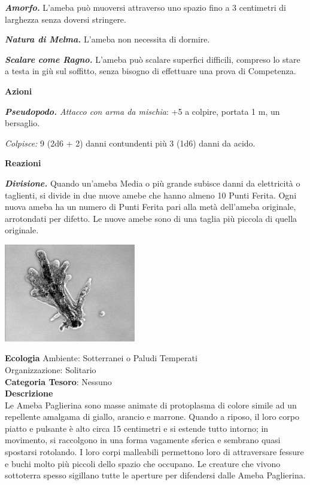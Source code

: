 \begin{multicols}{2}
{\emph{\textbf{Amorfo.}} L'ameba può muoversi attraverso uno spazio fino a 3 centimetri di larghezza senza doversi stringere.

\emph{\textbf{Natura di Melma.}} L'ameba non necessita di dormire.

\emph{\textbf{Scalare come Ragno.}} L'ameba può scalare superfici difficili, compreso lo stare a testa in giù sul soffitto, senza bisogno di effettuare una prova di Competenza.

\textbf{Azioni}

\emph{\textbf{Pseudopodo.} Attacco con arma da mischia}: +5 a colpire, portata 1 m, un bersaglio.

\emph{Colpisce:} 9 (2d6 + 2) danni contundenti più 3 (1d6) danni da acido.

\textbf{Reazioni}

\emph{\textbf{Divisione.}} Quando un'ameba Media o più grande subisce danni da elettricità o taglienti, si divide in due nuove amebe che hanno almeno 10 Punti Ferita. Ogni nuova ameba ha un numero di Punti Ferita pari alla metà dell'ameba originale, arrotondati per difetto. Le nuove amebe sono di una taglia più piccola di quella originale.


\begin{center}
\includegraphics[width=0.43\textwidth]{immagini/Amoeba_proteus.png}
\end{center}

\textbf{Ecologia}
Ambiente: Sotterranei o Paludi Temperati\\
Organizzazione: Solitario\\
\textbf{Categoria Tesoro}: Nessuno\\
\textbf{Descrizione}\\
Le Ameba Paglierina sono masse animate di protoplasma di colore simile ad un repellente amalgama di giallo, arancio e marrone. Quando a riposo, il loro corpo piatto e pulsante è alto circa 15 centimetri e si estende tutto intorno; in movimento, si raccolgono in una forma vagamente sferica e sembrano quasi spostarsi rotolando. I loro corpi malleabili permettono loro di attraversare fessure e buchi molto più piccoli dello spazio che occupano. Le creature che vivono sottoterra spesso sigillano tutte le aperture per difendersi dalle Ameba Paglierina.

}
\end{multicols}
